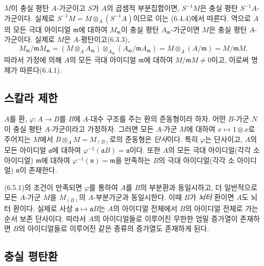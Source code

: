 \begin{env}[6.4.5]
\label{0.6.4.5-ko}
$M$이 충실 평탄 $A$-가군이고 $S$가 $A$의 곱셈적 부분집합이면,
$S^{-1}M$은 충실 평탄 $S^{-1}A$-가군이다. 실제로
$S^{-1}M=M\otimes_A(S^{-1}A)$이므로 이는 (6.4.4)에서 따른다.
역으로 $A$의 모든 극대 아이디얼 $\mathfrak m$에 대하여
$M_\mathfrak m$이 충실 평탄 $A_\mathfrak m$-가군이면 $M$은 충실
평탄 $A$-가군이다. 실제로 $M$은 $A$-평탄이고(6.3.3),
\[
  M_\mathfrak m/\mathfrak mM_\mathfrak m
  =(M\otimes_A A_\mathfrak m)
  \otimes_{A_\mathfrak m}
  (A_\mathfrak m/\mathfrak mA_\mathfrak m)
  =M\otimes_A(A/\mathfrak m)
  =M/\mathfrak mM.
\]
따라서 가정에 의해 $A$의 모든 극대 아이디얼 $\mathfrak m$에
대하여 $M/\mathfrak mM\neq0$이고, 이로써 명제가 따른다(6.4.1).
\end{env}

\subsection{스칼라 제한}
\label{subsection:0.6.5-ko}

\begin{env}[6.5.1]
\label{0.6.5.1-ko}
$A$를 환, $\varphi:A\to B$를 $B$에 $A$-대수 구조를 주는 환의
준동형이라 하자. 어떤 $B$-가군 $N$이 충실 평탄 $A$-가군이라고
가정하자. 그러면 모든 $A$-가군 $M$에 대하여
$x\mapsto1\otimes x$로 주어지는 $M$에서
$B\otimes_A M=M_{(B)}$로의 준동형은
\emph{단사}이다. 특히 $\varphi$는 단사이고, $A$의 모든 아이디얼
$\mathfrak a$에 대하여
$\varphi^{-1}(\mathfrak aB)=\mathfrak a$이다. 또한 $A$의 모든 극대
아이디얼(각각 소 아이디얼) $\mathfrak m$에 대하여
$\varphi^{-1}(\mathfrak n)=\mathfrak m$을 만족하는 $B$의 극대
아이디얼(각각 소 아이디얼) $\mathfrak n$이 존재한다.
\end{env}

\begin{env}[6.5.2]
\label{0.6.5.2-ko}
(6.5.1)의 조건이 만족되면 $\varphi$를 통하여 $A$를 $B$의 부분환과
동일시하고, 더 일반적으로 모든 $A$-가군 $M$을 $M_{(B)}$의
$A$-부분가군과 동일시한다. 이때 $B$가 \emph{뇌터} 환이면 $A$도
뇌터 환이다. 실제로 사상
$\mathfrak a\mapsto\mathfrak aB$는 $A$의 아이디얼 전체에서
$B$의 아이디얼 전체로 가는 순서 보존
단사이다. 따라서 $A$의 아이디얼들로 이루어진 무한한 엄밀 증가열이
존재하면 $B$의 아이디얼들로 이루어진 같은 종류의 증가열도
존재하게 된다.
\end{env}

\subsection{충실 평탄환}
\label{subsection:0.6.6-ko}

